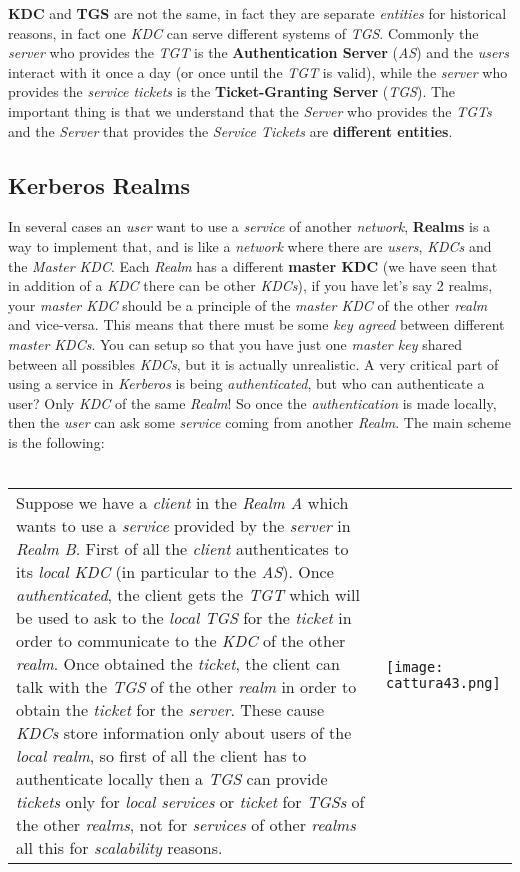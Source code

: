 \documentclass{article}
\begin{document}
\textbf{KDC} and \textbf{TGS} are not the same, in fact they are separate \emph{entities} for historical reasons, in fact one \emph{KDC} can serve different systems of \emph{TGS}. Commonly the \emph{server} who provides the \emph{TGT} is the \textbf{Authentication Server} (\emph{AS}) and the \emph{users} interact with it once a day (or once until the \emph{TGT} is valid), while the \emph{server} who provides the \emph{service tickets} is the \textbf{Ticket-Granting Server} (\emph{TGS}). The important thing is that we understand that the \emph{Server} who provides the \emph{TGTs} and the \emph{Server} that provides the \emph{Service Tickets }are \textbf{different entities}.
\subsection{Kerberos Realms}
In several cases an \emph{user} want to use a \emph{service} of another \emph{network}, \textbf{Realms} is a way to implement that, and is like a \emph{network} where there are \emph{users}, \emph{KDCs} and the \emph{Master KDC}. Each \emph{Realm} has a different \textbf{master KDC} (we have seen that in addition of a \emph{KDC} there can be other \emph{KDCs}), if you have let’s say 2 realms, your \emph{master KDC} should be a principle of the \emph{master KDC} of the other \emph{realm} and vice-versa. This means that there must be some \emph{key agreed} between different \emph{master KDCs}. You can setup so that you have just one \emph{master key }shared between all possibles \emph{KDCs}, but it is actually unrealistic. A very critical part of using a service in \emph{Kerberos} is being \emph{authenticated}, but who can authenticate a user? Only \emph{KDC} of the same \emph{Realm}! So once the \emph{authentication} is made locally, then the \emph{user} can ask some \emph{service} coming from another \emph{Realm}. The main scheme is the following:\\\\
\begin{tabular}{C{10cm}  L{10.5cm}}
Suppose we have a \emph{client} in the \emph{Realm A} which wants to use a \emph{service} provided by the \emph{server} in \emph{Realm B}. First of all the \emph{client} authenticates to its \emph{local KDC} (in particular to the \emph{AS}). Once \emph{authenticated}, the client gets the \emph{TGT} which will be used to ask to the \emph{local TGS} for the \emph{ticket} in order to communicate to the \emph{KDC} of the other \emph{realm}. Once obtained the \emph{ticket}, the client can talk with the \emph{TGS} of the other \emph{realm} in order to obtain the \emph{ticket} for the \emph{server}.  These cause \emph{KDCs} store information only about users of the \emph{local realm}, so first of all the client has to authenticate locally then a \emph{TGS} can provide \emph{tickets} only for \emph{local services} or \emph{ticket} for \emph{TGSs} of the other \emph{realms}, not for \emph{services} of other \emph{realms} all this for \emph{scalability} reasons.  &\texttt{[image: cattura43.png]}
\end{tabular}
\clearpage
\end{document}
